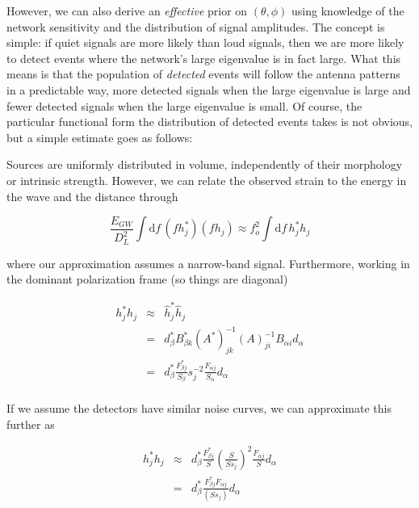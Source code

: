 \documentclass[10pt]{article}
\begin{document}
However, we can also derive an \emph{effective} prior on $(\theta,\phi)$ using knowledge of the network sensitivity and the distribution of signal amplitudes. The concept is simple: if quiet signals are more likely than loud signals, then we are more likely to detect events where the network's large eigenvalue is in fact large. What this means is that the population of \emph{detected} events will follow the antenna patterns in a predictable way, more detected signals when the large eigenvalue is large and fewer detected signals when the large eigenvalue is small. Of course, the particular functional form the distribution of detected events takes is not obvious, but a simple estimate goes as follows:

Sources are uniformly distributed in volume, independently of their morphology or intrinsic strength. However, we can relate the observed strain to the energy in the wave and the distance through

\begin{equation}
\frac{E_{GW}}{D_L^2} \int\mathrm{d}f\, (f h_{j}^\ast)(f h_{j}) \approx f_o^2 \int\mathrm{d}f\, h_{j}^\ast h_{j}
\end{equation}

where our approximation assumes a narrow-band signal. Furthermore, working in the dominant polarization frame (so things are diagonal)

\begin{eqnarray}
h_{j}^\ast h_{j} & \approx & \hat{h}_j^\ast \hat{h}_j \\
                 & = & d_\beta^\ast B_{\beta k}^\ast \left(A^\ast\right)_{jk}^{-1} \left(A\right)_{ji}^{-1} B_{\alpha i} d_\alpha \\
                 & = & d_\beta^\ast \frac{F_{\beta j}^\ast}{S_\beta} s_j^{-2} \frac{F_{\alpha j}}{S_\alpha} d_\alpha \\
\end{eqnarray}

If we assume the detectors have similar noise curves, we can approximate this further as

\begin{eqnarray}
h_{j}^\ast h_{j} & \approx & d_\beta^\ast \frac{F_{\beta j}^\ast}{S} \left(\frac{S}{S s_j}\right)^{2} \frac{F_{\alpha j}}{S} d_\alpha \\
                 & = & d_\beta^\ast \frac{F_{\beta j}^\ast F_{\alpha j}}{\left(S s_j\right)} d_\alpha \\
\end{eqnarray}
\end{document}
